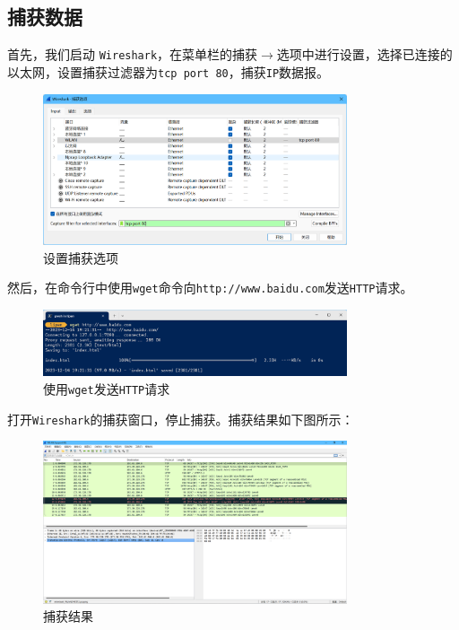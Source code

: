 \documentclass{article}
\begin{document}
\subsection{捕获数据}

首先，我们启动 \texttt{Wireshark}，在菜单栏的捕获\(\to \)选项中进行设置，选择已连接的以太网，设置捕获过滤器为\texttt{tcp port 80}，捕获\texttt{IP}数据报。

\begin{figure}[H]
  \centering
  \includegraphics[width=0.8\textwidth]{img/1.png}
  \caption{设置捕获选项}
  \label{fig:1}
\end{figure}

然后，在命令行中使用\texttt{wget}命令向\texttt{http://www.baidu.com}发送\texttt{HTTP}请求。

\begin{figure}[H]
  \centering
  \includegraphics[width=0.8\textwidth]{img/2.png}
  \caption{使用\texttt{wget}发送\texttt{HTTP}请求}
  \label{fig:2}
\end{figure}

打开\texttt{Wireshark}的捕获窗口，停止捕获。捕获结果如下图所示：

\begin{figure}[H]
  \centering
  \includegraphics[width=0.8\textwidth]{img/3.png}
  \caption{捕获结果}
  \label{fig:3}
\end{figure}
\end{document}
